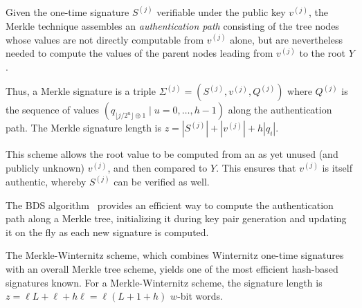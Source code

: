 \documentclass[11pt]{llncs}
\begin{document}
Given the one-time signature $S^{(j)}$ verifiable under the public key $v^{(j)}$, the Merkle technique assembles an \emph{authentication path} consisting of the tree nodes whose values are not directly computable from $v^{(j)}$ alone, but are nevertheless needed to compute the values of the parent nodes leading from $v^{(j)}$ to the root $Y$.

Thus, a Merkle signature is a triple $\Sigma^{(j)} = (S^{(j)}, v^{(j)}, Q^{(j)})$ where $Q^{(j)}$ is the sequence of values $(q_{\lfloor j/2^u \rfloor \oplus 1} \mid u = 0, \dots, h-1)$ along the authentication path. The Merkle signature length is $z = |S^{(j)}| + |v^{(j)}| + h |q_i|$.

This scheme allows the root value to be computed from an as yet unused (and publicly unknown) $v^{(j)}$, and then compared to $Y$. This ensures that $v^{(j)}$ is itself authentic, whereby $S^{(j)}$ can be verified as well.

The BDS algorithm~\cite{buchmann-dahmen-schneider} provides an efficient way to compute the authentication path along a Merkle tree, initializing it during key pair generation and updating it on the fly as each new signature is computed.

The Merkle-Winternitz scheme, which combines Winternitz one-time signatures with an overall Merkle tree scheme, yields one of the most efficient hash-based signatures known.
For a Merkle-Winternitz scheme, the signature length is $z = \ell L + \ell + h\ell = \ell(L + 1 + h)$ $w$-bit words. 

\begin{comment}
\subsubsection{Implementation:}
Tree node indices of the $q_0, \dots, q_{h-1}$ for the $j$-th message, $0 \leqslant j < 2^h$:
\begin{itemize}
\item The leaf nodes have indices in range $2^h$ and $2^{h+1}-1$, and the leaf index associated with $M^{(j)}$ is $2^h + j$.
\item The path from the $k$-th leaf node and the root (which is node 1, not 0) consists of the node indices $\lfloor k/2^u \rfloor$, $u = 0, 1, \dots, h$. For instance, the path from node 12 to the root in a tree of height $h = 3$ consists of nodes
$\lfloor 12/2^0 \rfloor = 12$ (the lead node itself),
$\lfloor 12/2^1 \rfloor = 6$,
$\lfloor 12/2^2 \rfloor = 3$,
$\lfloor 12/2^3 \rfloor = 1$ (the root).
\item The $q$-nodes associated to the leaf node of index $k$ are the siblings of the non-root nodes on the path to the root, hence $\lfloor k/2^u \rfloor \oplus 1$, $u = 0, 1, \dots, h - 1$. For instance, the $q$-nodes for the above example are the nodes
$\lfloor 12/2^0 \rfloor \oplus 1 = 13$,
$\lfloor 12/2^1 \rfloor \oplus 1 = 7$,
$\lfloor 12/2^2 \rfloor \oplus 1 = 2$.
\end{itemize}
\end{comment}
\end{document}
